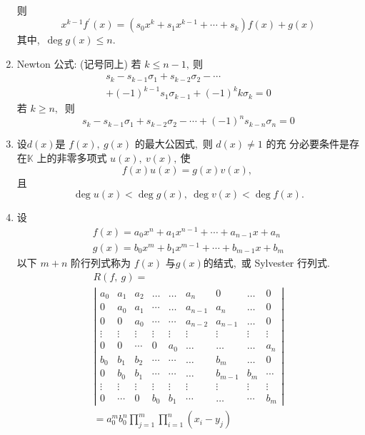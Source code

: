 \begin{enumerate}
		则
		$$x^{k-1} f^{\prime}(x)=\left(s_{0} x^{k}+s_{1} x^{k-1}+\cdots+s_{k}\right) f(x)+g(x)$$
		其中,\  $ \operatorname{deg} g(x) \leqslant n .$
		\item Newton 公式: (记号同上) 若 $ k \leqslant n-1 ,\  $则	
		$$\begin{array}{c}
			s_{k}-s_{k-1} \sigma_{1}+s_{k-2} \sigma_{2}-\cdots \\
			+(-1)^{k-1} s_{1} \sigma_{k-1}+(-1)^{k} k \sigma_{k}=0
		\end{array}$$
		若 $ k \geqslant n ,\ $ 则
		$$	s_{k}-s_{k-1} \sigma_{1}+s_{k-2} \sigma_{2}-\cdots+(-1)^{n} s_{k-n} \sigma_{n}=0$$
		\item 设$  d(x)  $是  $f(x),\  g(x) $ 的最大公因式,\  则 $ d(x) \neq 1$  的充 分必要条件是存在$  \mathbb{K} $ 上的非零多项式 $ u(x),\  v(x) ,\  $使
		$$f(x) u(x)=g(x) v(x),\ $$
		且
		$$\operatorname{deg} u(x)<\operatorname{deg} g(x),\  \operatorname{deg} v(x)<\operatorname{deg} f(x) .$$
		\item 设
		$$\begin{array}{l}
			f(x)=a_{0} x^{n}+a_{1} x^{n-1}+\cdots+a_{n-1} x+a_{n} \\
			g(x)=b_{0} x^{m}+b_{1} x^{m-1}+\cdots+b_{m-1} x+b_{m}
		\end{array}$$
		以下 $ m+n $ 阶行列式称为 $ f(x) $ 与$  g(x)  $的结式,\  或 Sylvester 行列式.
		$$\begin{array}{l}
			R(f,\  g)= \\
			\left|\begin{array}{ccccccccc}
				a_{0} & a_{1} & a_{2} & \ldots & \ldots & a_{n} & 0 & \ldots & 0 \\
				0 & a_{0} & a_{1} & \cdots & \ldots & a_{n-1} & a_{n} & \ldots & 0 \\
				0 & 0 & a_{0} & \cdots & \cdots & a_{n-2} & a_{n-1} & \ldots & 0 \\
				\vdots & \vdots & \vdots & \vdots & \vdots & \vdots & \vdots & \vdots & \vdots \\
				0 & 0 & \cdots & 0 & a_{0} & \ldots & \ldots & \ldots & a_{n} \\
				b_{0} & b_{1} & b_{2} & \cdots & \cdots & \ldots & b_{m} & \ldots & 0 \\
				0 & b_{0} & b_{1} & \cdots & \cdots & \ldots & b_{m-1} & b_{m} & \cdots \\
				\vdots & \vdots & \vdots & \vdots & \vdots & \vdots & \vdots & \vdots & \vdots \\
				0 & \cdots & 0 & b_{0} & b_{1} & \cdots & \ldots & \cdots & b_{m}
			\end{array}\right| \\
			=a_{0}^{m} b_{0}^{n} \prod_{j=1}^{m} \prod_{i=1}^{n}\left(x_{i}-y_{j}\right) \\
		\end{array}$$
		

\end{enumerate}
